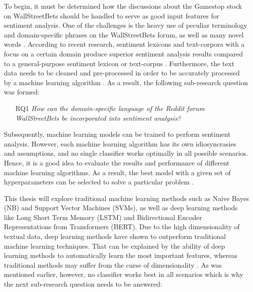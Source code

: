 \documentclass[11pt, a4paper]{article}
\begin{document}
To begin, it must be determined how the discussions about the Gamestop stock on WallStreetBets should be handled to serve as good input features for sentiment analysis. 
One of the challenges is the heavy use of peculiar terminology and domain-specific phrases on the WallStreetBets forum, as well as many novel words \citep{anand2021WallstreetbetsAgainstWallstreet}. 
According to recent research, sentiment lexicons and text-corpora with a focus on a certain domain produce superior sentiment analysis results compared to a 
general-purpose sentiment lexicon or text-corpus \citep{park2015EfficientExtraction}. Furthermore, the text data needs to be cleaned and pre-processed in order to be accurately 
processed by a machine learning algorithm \citep{jemai2021SentimentAnalysis}. As a result, the following sub-research question was formed:

\begin{itemize}
    \item[RQ1] \emph{How can the domain-specific language of the Reddit forum WallStreetBets be incorporated into sentiment analysis?}
\end{itemize}

Subsequently, machine learning models can be trained to perform sentiment analysis. However, 
each machine learning algorithm has its own idiosyncrasies and assumptions, and no single classifier 
works optimally in all possible scenarios. Hence, it is a good idea to evaluate the results and 
performance of different machine learning algorithms. As a result, the best model with a given set 
of hyperparameters can be selected to solve a particular problem \citep[p. 53]{raschka2019pythonmachinelearning}. 

This thesis will explore traditional machine learning methods such as Naive Bayes (NB) 
and Support Vector Machines (SVMs), as well as deep learning methods like 
Long Short Term Memory (LSTM) and Bidirectional Encoder Representations from 
Transformers (BERT). %
Due to the high dimensionality of textual data, deep learning methods have shown 
to outperform traditional machine learning techniques. That can be explained by the 
ability of deep learning methods to automatically learn the most important features, whereas traditional 
methods may suffer from the curse of dimensionality \citep{fu2018lexiconenhancedlstm}.
As was mentioned earlier, however, no classifier works best in all scenarios which is why the next sub-research question needs to be answered:
\end{document}
